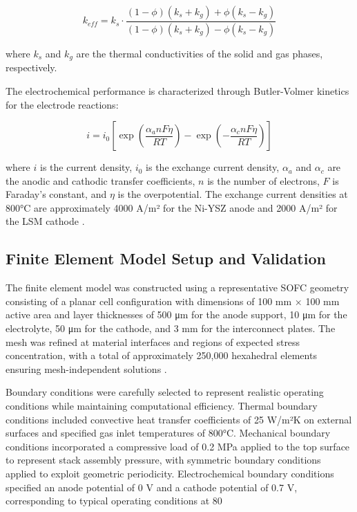 \documentclass[conference]{IEEEtran}
\begin{document}
\begin{equation}
k_{eff} = k_s \cdot \frac{(1-\phi)(k_s + k_g) + \phi(k_s - k_g)}{(1-\phi)(k_s + k_g) - \phi(k_s - k_g)}
\end{equation}

where $k_s$ and $k_g$ are the thermal conductivities of the solid and gas phases, respectively.

The electrochemical performance is characterized through Butler-Volmer kinetics for the electrode reactions:

\begin{equation}
i = i_0 \left[\exp\left(\frac{\alpha_a nF\eta}{RT}\right) - \exp\left(-\frac{\alpha_c nF\eta}{RT}\right)\right]
\end{equation}

where $i$ is the current density, $i_0$ is the exchange current density, $\alpha_a$ and $\alpha_c$ are the anodic and cathodic transfer coefficients, $n$ is the number of electrons, $F$ is Faraday's constant, and $\eta$ is the overpotential. The exchange current densities at 800°C are approximately 4000 A/m² for the Ni-YSZ anode and 2000 A/m² for the LSM cathode \cite{jiang2024electrochemistry}.

\subsection{Finite Element Model Setup and Validation}

The finite element model was constructed using a representative SOFC geometry consisting of a planar cell configuration with dimensions of 100 mm × 100 mm active area and layer thicknesses of 500 μm for the anode support, 10 μm for the electrolyte, 50 μm for the cathode, and 3 mm for the interconnect plates. The mesh was refined at material interfaces and regions of expected stress concentration, with a total of approximately 250,000 hexahedral elements ensuring mesh-independent solutions \cite{lin2024numerical}.

Boundary conditions were carefully selected to represent realistic operating conditions while maintaining computational efficiency. Thermal boundary conditions included convective heat transfer coefficients of 25 W/m²K on external surfaces and specified gas inlet temperatures of 800°C. Mechanical boundary conditions incorporated a compressive load of 0.2 MPa applied to the top surface to represent stack assembly pressure, with symmetric boundary conditions applied to exploit geometric periodicity. Electrochemical boundary conditions specified an anode potential of 0 V and a cathode potential of 0.7 V, corresponding to typical operating conditions at 80%
\end{document}
